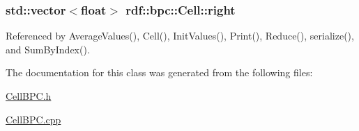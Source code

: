 \subsubsection[{\texorpdfstring{right}{right}}]{\setlength{\rightskip}{0pt plus 5cm}std\+::vector$<$float$>$ rdf\+::bpc\+::\+Cell\+::right}\hypertarget{classrdf_1_1bpc_1_1Cell_a2d7be4deab042275199ade765509fcea}{}\label{classrdf_1_1bpc_1_1Cell_a2d7be4deab042275199ade765509fcea}


Referenced by Average\+Values(), Cell(), Init\+Values(), Print(), Reduce(), serialize(), and Sum\+By\+Index().



The documentation for this class was generated from the following files\+:\begin{DoxyCompactItemize}
\item 
\hyperlink{CellBPC_8h}{Cell\+B\+P\+C.\+h}\item 
\hyperlink{CellBPC_8cpp}{Cell\+B\+P\+C.\+cpp}\end{DoxyCompactItemize}
